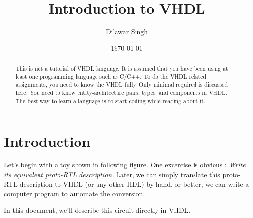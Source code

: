 \documentclass[a4paper,10pt]{article}
\title{Introduction to VHDL}
\author{Dilawar Singh}
\date{\today}
\begin{document}
\maketitle

\begin{abstract}
  
  This is not a tutorial of VHDL language. It is assumed that you have been
  using at least one programming language such as C/C++. To do the VHDL related
  assignments, you need to know the VHDL fully. Only minimal required is
  discussed here. You need to know entity-architecture pairs, types, and
  components in VHDL. The best way to learn a language is to start coding while
  reading about it.

\end{abstract}

\section{Introduction}
  
 Let's begin with a toy shown in following figure. One excercise is obvious :
 \emph{Write its equivalent proto-RTL description.} Later, we can simply
 translate this proto-RTL description to VHDL (or any other HDL) by hand, or
 better, we can write a computer program to automate the conversion.

 In this document, we'll describe this circuit directly in VHDL.
 
\end{document}
